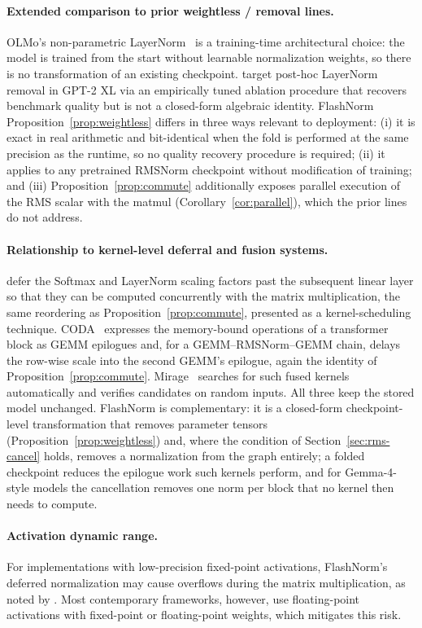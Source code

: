 \documentclass{article}
\begin{document}
\paragraph{Extended comparison to prior weightless / removal lines.} OLMo's non-parametric LayerNorm~\citep{olmo2} is a training-time architectural choice: the model is trained from the start without learnable normalization weights, so there is no transformation of an existing checkpoint. \citet{remove-norm2} target post-hoc LayerNorm removal in GPT-2 XL via an empirically tuned ablation procedure that recovers benchmark quality but is not a closed-form algebraic identity. FlashNorm Proposition~\ref{prop:weightless} differs in three ways relevant to deployment: (i) it is exact in real arithmetic and bit-identical when the fold is performed at the same precision as the runtime, so no quality recovery procedure is required; (ii) it applies to any pretrained RMSNorm checkpoint without modification of training; and (iii) Proposition~\ref{prop:commute} additionally exposes parallel execution of the RMS scalar with the matmul (Corollary~\ref{cor:parallel}), which the prior lines do not address.

\paragraph{Relationship to kernel-level deferral and fusion systems.} \citet{opFusion} defer the Softmax and LayerNorm scaling factors past the subsequent linear layer so that they can be computed concurrently with the matrix multiplication, the same reordering as Proposition~\ref{prop:commute}, presented as a kernel-scheduling technique. CODA~\citep{coda} expresses the memory-bound operations of a transformer block as GEMM epilogues and, for a GEMM--RMSNorm--GEMM chain, delays the row-wise scale into the second GEMM's epilogue, again the identity of Proposition~\ref{prop:commute}. Mirage~\citep{mirage} searches for such fused kernels automatically and verifies candidates on random inputs. All three keep the stored model unchanged. FlashNorm is complementary: it is a closed-form checkpoint-level transformation that removes parameter tensors (Proposition~\ref{prop:weightless}) and, where the condition of Section~\ref{sec:rms-cancel} holds, removes a normalization from the graph entirely; a folded checkpoint reduces the epilogue work such kernels perform, and for Gemma-4-style models the cancellation removes one norm per block that no kernel then needs to compute.

\paragraph{Activation dynamic range.}
For implementations with low-precision fixed-point activations, FlashNorm's deferred
normalization may cause overflows during the matrix multiplication, as noted by \citet{MXNorm}.
Most contemporary frameworks, however, use floating-point activations with
fixed-point or floating-point weights, which mitigates this risk.
\end{document}
